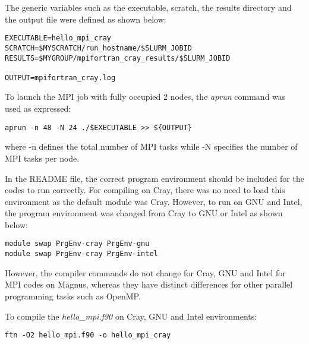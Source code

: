 The generic variables such as the executable, scratch, the results directory and the output file were defined as shown below:

\begin{tcolorbox}
\begin{Verbatim}[fontsize=\scriptsize]
EXECUTABLE=hello_mpi_cray
SCRATCH=$MYSCRATCH/run_hostname/$SLURM_JOBID
RESULTS=$MYGROUP/mpifortran_cray_results/$SLURM_JOBID

OUTPUT=mpifortran_cray.log 
\end{Verbatim}
\end{tcolorbox}

To launch the MPI job with fully occupied 2 nodes, the \emph{aprun} command was used as expressed:

\begin{tcolorbox}
\begin{Verbatim}[fontsize=\scriptsize]
aprun -n 48 -N 24 ./$EXECUTABLE >> ${OUTPUT}
\end{Verbatim}
\end{tcolorbox}

where -n defines the total number of MPI tasks while -N specifies the number of MPI tasks per node.

In the README file, the correct program environment should be included for the codes to run correctly. For compiling on Cray, there was no need to load
this environment as the default module was Cray. However, to run on GNU and Intel, the program environment was changed from Cray to GNU or Intel as
shown below:

\begin{tcolorbox}
\begin{Verbatim}[fontsize=\scriptsize]
module swap PrgEnv-cray PrgEnv-gnu
module swap PrgEnv-cray PrgEnv-intel
\end{Verbatim}
\end{tcolorbox}

However, the compiler commands do not change for Cray, GNU and Intel for MPI codes on Magnus, whereas they have distinct differences for other parallel
programming tasks such as OpenMP.

To compile the \emph{hello\_mpi.f90} on Cray, GNU and Intel environments:

\begin{tcolorbox}
\begin{Verbatim}[fontsize=\scriptsize]
ftn -O2 hello_mpi.f90 -o hello_mpi_cray
\end{Verbatim}
\end{tcolorbox}


